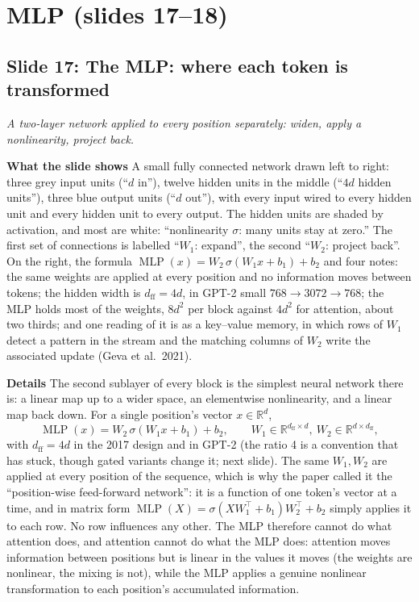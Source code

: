 \documentclass[11pt,letterpaper]{article}
\newcommand{\setstage}[1]{\colorlet{stagec}{#1}}
\newcommand{\slide}[3]{%
  \subsection[Slide #1: #2]{Slide #1: #2}%
  {\color{muted}\itshape #3\par}\medskip}
\newcommand{\para}[1]{\medskip\noindent\textbf{#1}\quad}
\newcommand{\dff}{d_{\mathrm{ff}}}
\DeclareMathOperator{\MLP}{MLP}
\begin{document}
\setstage{mlp}
\section{MLP (slides 17--18)}

\slide{17}{The MLP: where each token is transformed}{A two-layer network applied to every position separately: widen, apply a nonlinearity, project back.}

\para{What the slide shows} A small fully connected network drawn left to right: three grey input units (``$d$ in''), twelve hidden units in the middle (``$4d$ hidden units''), three blue output units (``$d$ out''), with every input wired to every hidden unit and every hidden unit to every output. The hidden units are shaded by activation, and most are white: ``nonlinearity $\sigma$: many units stay at zero.'' The first set of connections is labelled ``$W_1$: expand'', the second ``$W_2$: project back''. On the right, the formula $\MLP(x)=W_2\,\sigma(W_1x+b_1)+b_2$ and four notes: the same weights are applied at every position and no information moves between tokens; the hidden width is $\dff=4d$, in GPT-2 small $768\to3072\to768$; the MLP holds most of the weights, $8d^2$ per block against $4d^2$ for attention, about two thirds; and one reading of it is as a key--value memory, in which rows of $W_1$ detect a pattern in the stream and the matching columns of $W_2$ write the associated update (Geva et al.\ 2021).

\para{Details} The second sublayer of every block is the simplest neural network there is: a linear map up to a wider space, an elementwise nonlinearity, and a linear map back down. For a single position's vector $x\in\mathbb{R}^d$,
\[
\MLP(x)=W_2\,\sigma(W_1x+b_1)+b_2,\qquad W_1\in\mathbb{R}^{\dff\times d},\ W_2\in\mathbb{R}^{d\times\dff},
\]
with $\dff=4d$ in the 2017 design and in GPT-2 (the ratio 4 is a convention that has stuck, though gated variants change it; next slide). The same $W_1,W_2$ are applied at every position of the sequence, which is why the paper called it the ``position-wise feed-forward network'': it is a function of one token's vector at a time, and in matrix form $\MLP(X)=\sigma(XW_1^{\top}+b_1)W_2^{\top}+b_2$ simply applies it to each row. No row influences any other. The MLP therefore cannot do what attention does, and attention cannot do what the MLP does: attention moves information between positions but is linear in the values it moves (the weights are nonlinear, the mixing is not), while the MLP applies a genuine nonlinear transformation to each position's accumulated information.
\end{document}
